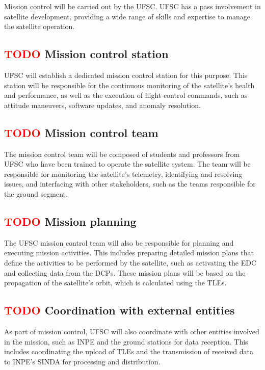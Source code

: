 Mission control will be carried out by the UFSC. UFSC has a pass involvement in satellite development, providing a wide range of skills and expertise to manage the satellite operation.

\subsection{ \textcolor{red}{TODO} Mission control station}

UFSC will establish a dedicated mission control station for this purpose. This station will be responsible for the continuous monitoring of the satellite's health and performance, as well as the execution of flight control commands, such as attitude maneuvers, software updates, and anomaly resolution.

\subsection{ \textcolor{red}{TODO} Mission control team}

The mission control team will be composed of students and professors from UFSC who have been trained to operate the satellite system. The team will be responsible for monitoring the satellite's telemetry, identifying and resolving issues, and interfacing with other stakeholders, such as the teams responsible for the ground segment.

\subsection{ \textcolor{red}{TODO} Mission planning}

The UFSC mission control team will also be responsible for planning and executing mission activities. This includes preparing detailed mission plans that define the activities to be performed by the satellite, such as activating the EDC and collecting data from the DCPs. These mission plans will be based on the propagation of the satellite's orbit, which is calculated using the TLEs.

\subsection{ \textcolor{red}{TODO} Coordination with external entities}

As part of mission control, UFSC will also coordinate with other entities involved in the mission, such as INPE and the ground stations for data reception. This includes coordinating the upload of TLEs and the transmission of received data to INPE's SINDA for processing and distribution.

